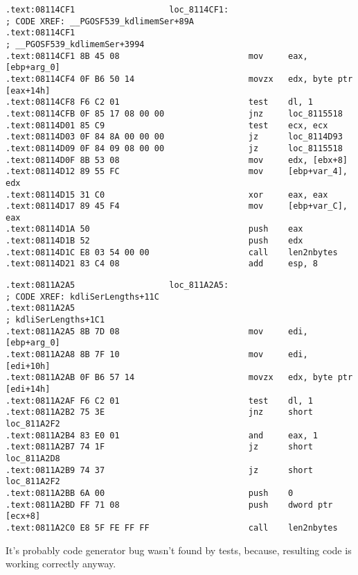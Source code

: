 \documentclass[11pt,a4paper,oneside]{book}
\begin{document}
\begin{lstlisting}
.text:08114CF1                   loc_8114CF1:                            ; CODE XREF: __PGOSF539_kdlimemSer+89A
.text:08114CF1                                                           ; __PGOSF539_kdlimemSer+3994
.text:08114CF1 8B 45 08                          mov     eax, [ebp+arg_0]
.text:08114CF4 0F B6 50 14                       movzx   edx, byte ptr [eax+14h]
.text:08114CF8 F6 C2 01                          test    dl, 1
.text:08114CFB 0F 85 17 08 00 00                 jnz     loc_8115518
.text:08114D01 85 C9                             test    ecx, ecx
.text:08114D03 0F 84 8A 00 00 00                 jz      loc_8114D93
.text:08114D09 0F 84 09 08 00 00                 jz      loc_8115518
.text:08114D0F 8B 53 08                          mov     edx, [ebx+8]
.text:08114D12 89 55 FC                          mov     [ebp+var_4], edx
.text:08114D15 31 C0                             xor     eax, eax
.text:08114D17 89 45 F4                          mov     [ebp+var_C], eax
.text:08114D1A 50                                push    eax
.text:08114D1B 52                                push    edx
.text:08114D1C E8 03 54 00 00                    call    len2nbytes
.text:08114D21 83 C4 08                          add     esp, 8
\end{lstlisting}


\begin{lstlisting}
.text:0811A2A5                   loc_811A2A5:                            ; CODE XREF: kdliSerLengths+11C
.text:0811A2A5                                                           ; kdliSerLengths+1C1
.text:0811A2A5 8B 7D 08                          mov     edi, [ebp+arg_0]
.text:0811A2A8 8B 7F 10                          mov     edi, [edi+10h]
.text:0811A2AB 0F B6 57 14                       movzx   edx, byte ptr [edi+14h]
.text:0811A2AF F6 C2 01                          test    dl, 1
.text:0811A2B2 75 3E                             jnz     short loc_811A2F2
.text:0811A2B4 83 E0 01                          and     eax, 1
.text:0811A2B7 74 1F                             jz      short loc_811A2D8
.text:0811A2B9 74 37                             jz      short loc_811A2F2
.text:0811A2BB 6A 00                             push    0
.text:0811A2BD FF 71 08                          push    dword ptr [ecx+8]
.text:0811A2C0 E8 5F FE FF FF                    call    len2nbytes
\end{lstlisting}

{It's probably code generator bug wasn't found by tests, because, 
resulting code is working correctly anyway.}




\end{document}
